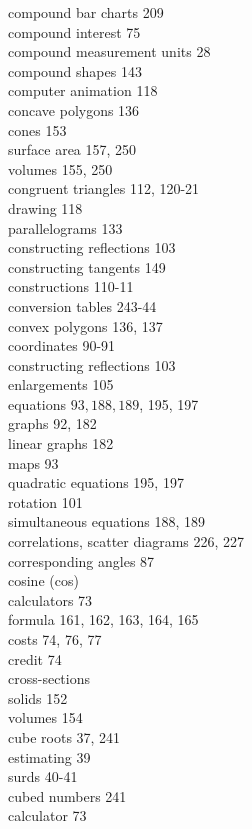 \documentclass[10pt]{article}
\begin{document}
compound bar charts 209\\
compound interest 75\\
compound measurement units 28\\
compound shapes 143\\
computer animation 118\\
concave polygons 136\\
cones 153\\
surface area 157, 250\\
volumes 155, 250\\
congruent triangles 112, 120-21\\
drawing 118\\
parallelograms 133\\
constructing reflections 103\\
constructing tangents 149\\
constructions 110-11\\
conversion tables 243-44\\
convex polygons 136, 137\\
coordinates 90-91\\
constructing reflections 103\\
enlargements 105\\
equations $93,188,189$, 195, 197\\
graphs 92, 182\\
linear graphs 182\\
maps 93\\
quadratic equations 195, 197\\
rotation 101\\
simultaneous equations 188, 189\\
correlations, scatter diagrams 226, 227\\
corresponding angles 87\\
cosine (cos)\\
calculators 73\\
formula 161, 162, 163, 164, 165\\
costs 74, 76, 77\\
credit 74\\
cross-sections\\
solids 152\\
volumes 154\\
cube roots 37, 241\\
estimating 39\\
surds 40-41\\
cubed numbers 241\\
calculator 73\\
\end{document}
